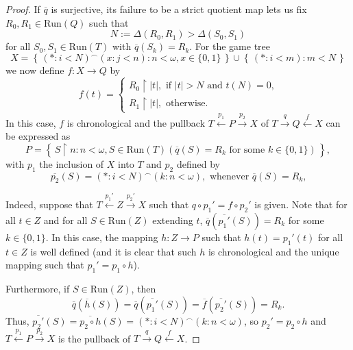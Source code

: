 \documentclass[12pt]{amsart}
\theoremstyle{definition}
\newcommand{\set}[1]{\left\{\, {#1} \,\right\}}
\newcommand{\seq}[1]{{\left( {#1} \right)}}
\newcommand{\Run}{{\mathrm{Run}}}
\DeclareMathOperator{\restrict}{\upharpoonright}
\begin{document}
\begin{proof}
	If $\overline{q}$ is surjective, its failure to be a strict quotient map lets us fix $R_0,R_1\in \Run(Q)$ such that 
	\begin{equation}\label{EQ_RegEpi_not_Proj}
		N:= \Delta(R_0,R_1) > \Delta(S_0,S_1)
	\end{equation}
	for all $S_0,S_1\in \Run(T)$ with $\overline{q}(S_k)=R_k$. For the game tree 
	\[
	X = \set{\seq{\ast:i<N}^\smallfrown \seq{x:j<n}:n<\omega, x\in \{0,1\}}\cup \set{\seq{\ast:i<m}:m<N}
	\]
	we now define $f\colon X\to Q$ by
	\[
	f(t) = \begin{cases}
		R_0\restrict |t|, \text{ if $|t|>N$ and $t(N)=0$,}\\
		R_1\restrict |t|, \text{ otherwise.}
	\end{cases}
	\]
	In this case, $f$ is chronological and the pullback $T\stackrel{p_1}{\leftarrow}P \stackrel{p_2}{\to} X$  of $T\stackrel{q}{\to}Q\stackrel{f}{\leftarrow}X$ can be expressed as
	\[
	P = \set{S\restrict n: n<\omega, S\in \Run(T) \left( \overline{q}(S) = R_k \text{ for some } k\in\{0,1\}\right)},
	\]
	with $p_1$ the inclusion of $X$ into $T$ and $p_2$ defined by
	\[
	\overline{p_2}(S) = 
	\seq{\ast:i<N}^\smallfrown \seq{k:n<\omega}, \text{ whenever $\overline{q}(S)=R_k$,}
	\]
	
	Indeed, suppose that $T\stackrel{p_1'}{\leftarrow}Z \stackrel{p_2'}{\to} X$ such that $q\circ p_1' = f\circ p_2'$ is given. Note that for all $t\in Z$ and for all $S\in \Run(Z)$ extending $t$, $\overline{q}(\overline{p_1'}(S)) = R_k$ for some $k\in\{0,1\}$. In this case, the mapping $h\colon Z\to P$ such that $h(t) = p_1'(t)$ for all $t\in Z$ is well defined (and it is clear that such $h$ is chronological and the unique mapping such that $p_1' =p_1\circ h$).
	
	Furthermore, if $S\in \Run(Z)$, then
	\[
	\overline{q}(\overline{h}(S)) = \overline{q}(\overline{p_1'}(S)) = \overline{f}(\overline{p_2'}(S)) = R_k.
	\]
	Thus, $\overline{p_2'}(S) = \overline{p_2\circ h}(S) = \seq{\ast:i<N}^\smallfrown \seq{k:n<\omega}$, so $p_2' = p_2\circ h$ and $T\stackrel{p_1}{\leftarrow}P \stackrel{p_2}{\to} X$ is the pullback of $T\stackrel{q}{\to}Q\stackrel{f}{\leftarrow}X$.
	

\end{proof}
\end{document}
